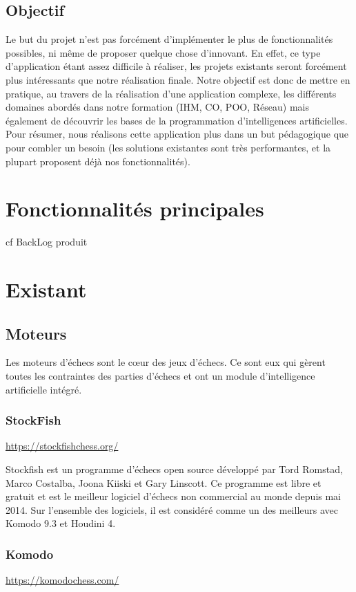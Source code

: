 \documentclass{article}
\begin{document}
\subsection{Objectif}
Le but du projet n'est pas forcément d'implémenter le plus de fonctionnalités possibles, ni même de proposer quelque chose d'innovant. En effet, ce type d'application étant assez difficile à réaliser, les projets existants seront forcément plus intéressants que notre réalisation finale.
Notre objectif est donc de mettre en pratique, au travers de la réalisation d'une application complexe, les différents domaines abordés dans notre formation (IHM, CO, POO, Réseau) mais également de découvrir les bases de la programmation d'intelligences artificielles.
Pour résumer, nous réalisons cette application plus dans un but pédagogique que pour combler un besoin (les solutions existantes sont très performantes, et la plupart proposent déjà nos fonctionnalités).

\section{Fonctionnalités principales}

cf BackLog produit

\newpage
\section{Existant}
\subsection{Moteurs}

Les moteurs d'échecs sont le cœur des jeux d'échecs. Ce sont eux qui gèrent toutes les contraintes des parties d'échecs et ont un module d'intelligence artificielle intégré.

\subsubsection{StockFish}
\url{https://stockfishchess.org/}
\newline

Stockfish est un programme d'échecs open source développé par Tord Romstad, Marco Costalba, Joona Kiiski et Gary Linscott. Ce programme est libre et gratuit et est le meilleur logiciel d'échecs non commercial au monde depuis mai 2014. Sur l'ensemble des logiciels, il est considéré comme un des meilleurs avec Komodo 9.3 et Houdini 4. 

\subsubsection{Komodo}
\url{https://komodochess.com/}
\newline
\end{document}
